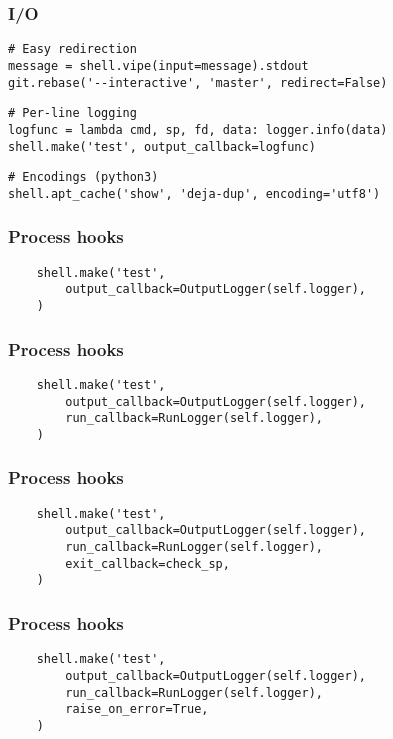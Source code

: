 \documentclass{beamer}
\begin{document}
\begin{frame}[fragile]
    \frametitle{I/O}
    \begin{verbatim}
# Easy redirection
message = shell.vipe(input=message).stdout
git.rebase('--interactive', 'master', redirect=False)
    \end{verbatim}
    \pause
    \begin{verbatim}
# Per-line logging
logfunc = lambda cmd, sp, fd, data: logger.info(data)
shell.make('test', output_callback=logfunc)
    \end{verbatim}
    \pause
    \begin{verbatim}
# Encodings (python3)
shell.apt_cache('show', 'deja-dup', encoding='utf8')
    \end{verbatim}
\end{frame}

\begin{frame}[fragile]
    \frametitle{Process hooks}
    \begin{verbatim}
    shell.make('test',
        output_callback=OutputLogger(self.logger),
    )
    \end{verbatim}
\end{frame}

\begin{frame}[fragile]
    \frametitle{Process hooks}
    \begin{verbatim}
    shell.make('test',
        output_callback=OutputLogger(self.logger),
        run_callback=RunLogger(self.logger),
    )
    \end{verbatim}
\end{frame}

\begin{frame}[fragile]
    \frametitle{Process hooks}
    \begin{verbatim}
    shell.make('test',
        output_callback=OutputLogger(self.logger),
        run_callback=RunLogger(self.logger),
        exit_callback=check_sp,
    )
    \end{verbatim}
\end{frame}

\begin{frame}[fragile]
    \frametitle{Process hooks}
    \begin{verbatim}
    shell.make('test',
        output_callback=OutputLogger(self.logger),
        run_callback=RunLogger(self.logger),
        raise_on_error=True,
    )
    \end{verbatim}
\end{frame}
\end{document}
